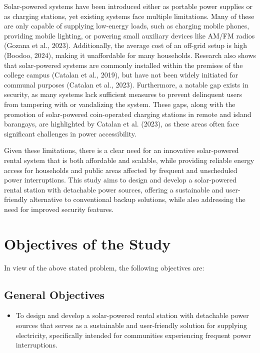 {Solar-powered systems have been introduced either as portable power supplies or as charging stations, yet existing systems face multiple limitations. Many of these are only capable of supplying low-energy loads, such as charging mobile phones, providing mobile lighting, or powering small auxiliary devices like AM/FM radios (Gozana et al., 2023). Additionally, the average cost of an off-grid setup is high (Boodoo, 2024), making it unaffordable for many households. Research also shows that solar-powered systems are commonly installed within the premises of the college campus (Catalan et al., 2019), but have not been widely initiated for communal purposes (Catalan et al., 2023). Furthermore, a notable gap exists in security, as many systems lack sufficient measures to prevent delinquent users from tampering with or vandalizing the system. These gaps, along with the promotion of solar-powered coin-operated charging stations in remote and island barangays, are highlighted by Catalan et al. (2023), as these areas often face significant challenges in power accessibility.

Given these limitations, there is a clear need for an innovative solar-powered rental system that is both affordable and scalable, while providing reliable energy access for households and public areas affected by frequent and unscheduled power interruptions. This study aims to design and develop a solar-powered rental station with detachable power sources, offering a sustainable and user-friendly alternative to conventional backup solutions, while also addressing the need for improved security features.

\section{Objectives of the Study}

In view of the above stated problem, the following objectives are:
\subsection{General Objectives}
\begin{itemize}
	\item To design and develop a solar-powered rental station with detachable power sources that serves as a sustainable and user-friendly solution for supplying electricity, specifically intended for communities experiencing frequent power interruptions. 
\end{itemize}
}
